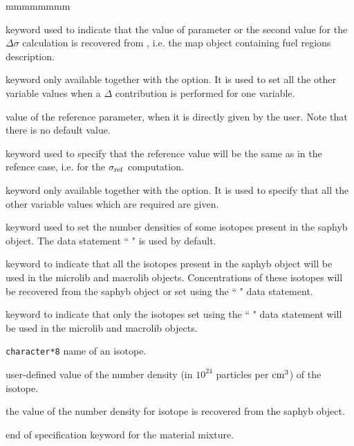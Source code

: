 \begin{ListeDeDescription}{mmmmmmmm}
\item[\moc{MAP}] keyword used to indicate that the value of parameter  or the second value for the $\Delta\sigma$ calculation is
recovered from , i.e. the {\sc map} object containing fuel regions description.

\item[\moc{REF}] keyword only available together with the  option. It is used to set all the other variable values when a $\Delta$ contribution is performed for one variable.  

\item[\dusa{valref}] value of the reference parameter, when it is directly given by the user. Note that there is no default value.

\item[\moc{SAMEASREF}] keyword used to specify that the reference value will be the same as in the refence case, i.e. for the $\sigma_{\rm ref}$ computation.

\item[\moc{ENDREF}] keyword only available together with the  option. It is used to specify that all the other variable values which are required are given.  

\item[\moc{MICRO}] keyword used to set the number densities of some isotopes present in the {\sc saphyb} object. The data statement `` " is used by default.

\item[\moc{ALL}] keyword to indicate that all the isotopes present in the  {\sc saphyb} object will be used in the {\sc microlib} and {\sc macrolib} objects. Concentrations of these isotopes will be recovered from the {\sc saphyb} object or set using
the `` " data statement.

\item[\moc{ONLY}] keyword to indicate that only the isotopes set using the `` " data statement will be used in the {\sc microlib} and {\sc macrolib} objects.

\item[\dusa{HISO}] {\tt character*8} name of an isotope.

\item[\dusa{conc}] user-defined value of the number density (in $10^{24}$ particles per ${\rm cm}^3$) of the isotope.

\item[\moc{*}] the value of the number density for isotope  is recovered from the {\sc saphyb} object.

\item[\moc{ENDMIX}] end of specification keyword for the material mixture.

\end{ListeDeDescription}

